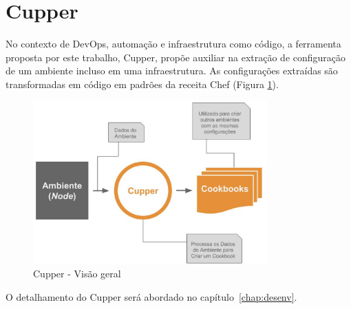 \section{Cupper}
\label{sec:cupper}

No contexto de DevOps, automação e infraestrutura como código, a ferramenta
proposta por este trabalho, Cupper, propõe auxiliar na extração de configuração
de um ambiente incluso em uma infraestrutura. As configurações extraídas são
transformadas em código em padrões da receita Chef (Figura \ref{fig:cupper_geral}).

\begin{figure}[h]
  \centering
  \includegraphics[width=0.8\textwidth]{figuras/cupper_geral.eps}
  \caption{Cupper - Visão geral}
  \label{fig:cupper_geral}
\end{figure}

O detalhamento do Cupper será abordado no capítulo~\ref{chap:desenv}.
